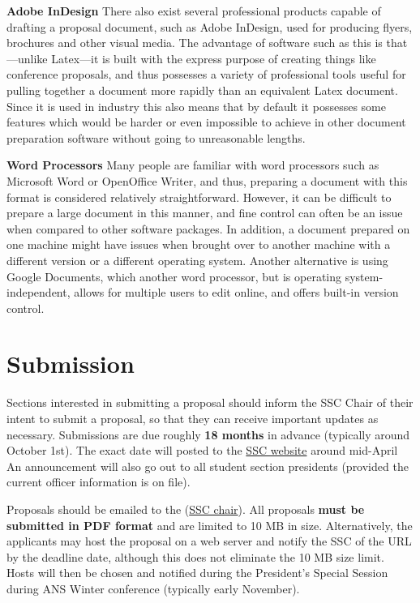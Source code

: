 \documentclass[12pt]{article}
\begin{document}
\textbf{Adobe InDesign}\newline
There also exist several professional products capable of drafting a proposal document, such as Adobe InDesign, used for producing flyers, brochures and other visual media. The advantage of software such as this is that---unlike Latex---it is built with the express purpose of creating things like conference proposals, and thus possesses a variety of professional tools useful for pulling together a document more rapidly than an equivalent Latex document. Since it is used in industry this also means that by default it possesses some features which would be harder or even impossible to achieve in other document preparation software without going to unreasonable lengths.

\textbf{Word Processors}\newline
Many people are familiar with word processors such as Microsoft Word or OpenOffice Writer, and thus, preparing a document with this format is considered relatively straightforward. However, it can be difficult to prepare a large document in this manner, and fine control can often be an issue when compared to other software packages. In addition, a document prepared on one machine might have issues when brought over to another machine with a different version or a different operating system.
Another alternative is using Google Documents, which another word processor, but is operating system-independent, allows for multiple users to edit online, and offers built-in version control.

\newpage
\section{Submission}
Sections interested in submitting a proposal should inform the SSC Chair of their intent to submit a proposal, so that they can receive important updates as necessary.
Submissions are due roughly \textbf{18 months} in advance (typically around October 1st).
The exact date will posted to the \href{http://students.ans.org/THELINK}{SSC website} around mid-April
An announcement will also go out to all student section presidents (provided the current officer information is on file).

Proposals should be emailed to the (\href{mailto:sscChair@gmail.com}{SSC chair}).
All proposals \textbf{must be submitted in PDF format} and are limited to 10 MB in size.
Alternatively, the applicants may host the proposal on a web server and notify the SSC of the URL by the deadline date, although this does not eliminate the 10 MB size limit.
Hosts will then be chosen and notified during the President's Special Session during ANS Winter conference (typically early November).
\end{document}
